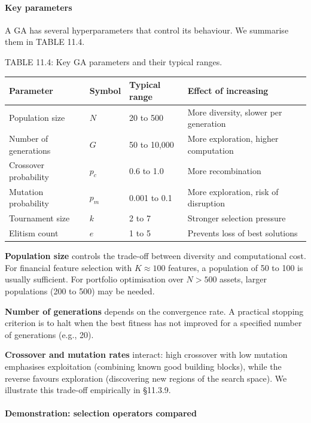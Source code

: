 \paragraph{Key parameters}

A GA has several hyperparameters that control its behaviour. We summarise them in TABLE 11.4.

TABLE 11.4: Key GA parameters and their typical ranges.

\bigskip\noindent
\begin{tabular}{p{}p{}p{}p{}}
\toprule
Parameter & Symbol & Typical range & Effect of increasing \\
\hline
Population size & $N$ & 20 to 500 & More diversity, slower per generation \\
Number of generations & $G$ & 50 to 10,000 & More exploration, higher computation \\
Crossover probability & $p_c$ & 0.6 to 1.0 & More recombination \\
Mutation probability & $p_m$ & 0.001 to 0.1 & More exploration, risk of disruption \\
Tournament size & $k$ & 2 to 7 & Stronger selection pressure \\
Elitism count & $e$ & 1 to 5 & Prevents loss of best solutions \\
\bottomrule
\end{tabular}

\bigskip

\textbf{Population size} controls the trade-off between diversity and computational cost. For financial feature selection with $K \approx 100$ features, a population of 50 to 100 is usually sufficient. For portfolio optimisation over $N > 500$ assets, larger populations (200 to 500) may be needed.

\textbf{Number of generations} depends on the convergence rate. A practical stopping criterion is to halt when the best fitness has not improved for a specified number of generations (e.g., 20).

\textbf{Crossover and mutation rates} interact: high crossover with low mutation emphasises exploitation (combining known good building blocks), while the reverse favours exploration (discovering new regions of the search space). We illustrate this trade-off empirically in §11.3.9.

\paragraph{Demonstration: selection operators compared}

